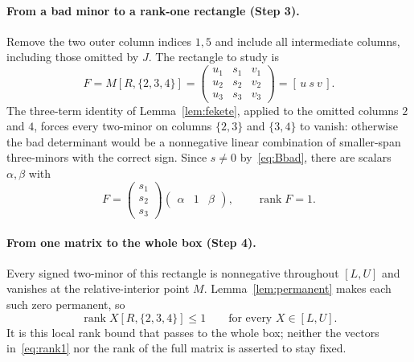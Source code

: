 \documentclass[10pt,a4paper]{article}
\theoremstyle{definition}
\theoremstyle{remark}
\numberwithin{equation}{section}
\DeclareMathOperator{\rank}{rank}
\begin{document}
\paragraph{From a bad minor to a rank-one rectangle (Step 3).}
Remove the two outer column indices $1,5$ and include all intermediate
columns, including those omitted by $J$. The rectangle to study is
\begin{equation}\label{eq:F55}
 F=M[R,\{2,3,4\}]=\begin{pmatrix}u_1&s_1&v_1\\u_2&s_2&v_2\\u_3&s_3&v_3\end{pmatrix}=[\,u\ s\ v\,].
\end{equation}
The three-term identity of Lemma~\ref{lem:fekete}, applied to the
omitted columns $2$ and $4$, forces every two-minor on columns $\{2,3\}$
and $\{3,4\}$ to vanish: otherwise the bad determinant would be a
nonnegative linear combination of smaller-span three-minors with the
correct sign. Since $s\neq0$ by~\eqref{eq:Bbad}, there are scalars
$\alpha,\beta$ with
\begin{equation}\label{eq:rank1}
 F=\begin{pmatrix}s_1\\s_2\\s_3\end{pmatrix}\begin{pmatrix}\alpha&1&\beta\end{pmatrix},
 \qquad \rank F=1.
\end{equation}

\paragraph{From one matrix to the whole box (Step 4).}
Every signed two-minor of this rectangle is nonnegative throughout
$[L,U]$ and vanishes at the relative-interior point $M$.
Lemma~\ref{lem:permanent} makes each such zero permanent, so
\begin{equation}\label{eq:rank1-box}
 \rank X[R,\{2,3,4\}]\leq1\qquad\text{for every }X\in[L,U].
\end{equation}
It is this local rank bound that passes to the whole box; neither the
vectors in~\eqref{eq:rank1} nor the rank of the full matrix is asserted
to stay fixed.
\end{document}
